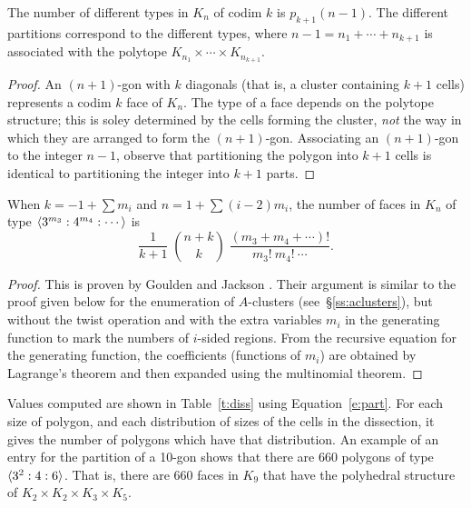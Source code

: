 \documentclass[10pt]{amsart}
\begin{document}
\begin{thm} 
The number of different types in $K_n$ of codim $k$ is $p_{k+1}(n-1)$. The different partitions correspond to the different types, where $n-1 = n_1 + \cdots + n_{k+1}$ is associated with the polytope $K_{n_1} \times \cdots \times K_{n_{k+1}}$.
\end{thm}

\begin{proof}
An $(n+1)$-gon with $k$ diagonals (that is, a cluster containing $k+1$ cells) represents a codim $k$ face of $K_n$. The type of a face depends on the polytope structure; this is soley determined by the cells forming the cluster, {\em not} the way in which they are arranged to form the $(n+1)$-gon. Associating an $(n+1)$-gon to the integer $n-1$, observe that partitioning the polygon into $k+1$ cells is identical to partitioning the integer into $k+1$ parts.
\end{proof}

\begin{thm} [Solution to {\em P3}\,]
When $k = -1 + \sum m_i$ and $n = 1 + \sum (i-2)m_i$, the number of faces in $K_n$ of type ${\langle} 3^{m_3} : 4^{m_4} : \cdots {\rangle}$ is 
$$\frac{1}{k+1} \; \binom{n+k}{k} \; \frac{(m_3 + m_4 + \cdots)!}{m_3! \ m_4! \ \cdots}.$$
\end{thm}

\begin{proof}
This is proven by Goulden and Jackson \cite[Exercise 2.7.14]{gj}. Their argument is similar to the proof given below for the enumeration of $A$-clusters (see~\S\ref{ss:aclusters}), but without the twist operation and with the extra variables $m_i$ in the generating function to mark the numbers of $i$-sided regions. From the recursive equation for the generating function, the coefficients (functions of $m_i$) are obtained by Lagrange's theorem and then expanded using the multinomial theorem.
\end{proof}

Values computed are shown in Table~\ref{t:diss} using Equation~\ref{e:part}.  For each size of polygon, and each distribution of sizes of the cells in the dissection, it gives the number of polygons which have that distribution.  An example of an entry for the partition of a 10-gon shows that there are 660 polygons of type ${\langle} 3^2:4:6 {\rangle}$.  That is, there are 660 faces in $K_9$ that have the polyhedral structure of $K_2 \times K_2 \times K_3 \times K_5$.

%
%
\end{document}
